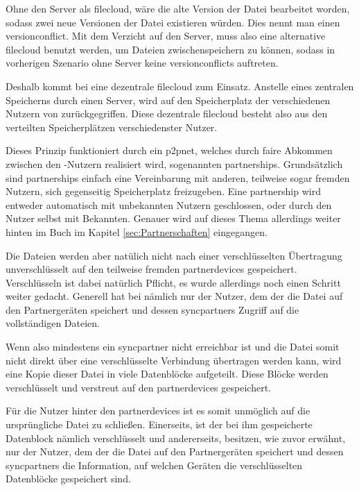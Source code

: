 Ohne den Server als \gls{filecloud}, wäre die alte Version der Datei bearbeitet worden, sodass zwei
neue Versionen der Datei existieren würden. Dies nennt man einen \gls{versionconflict}.
Mit dem Verzicht auf den Server, muss also eine alternative \gls{filecloud} benutzt
werden, um Dateien zwischenspeichern zu können, sodass in vorherigen Szenario ohne Server
keine \glspl{versionconflict} auftreten.

Deshalb kommt bei \sblit eine dezentrale \gls{filecloud} zum Einsatz. Anstelle
eines zentralen Speicherns durch einen Server, wird auf den Speicherplatz der
verschiedenen Nutzern von \sblit zurückgegriffen. Diese dezentrale \gls{filecloud}
besteht also aus den verteilten Speicherplätzen verschiedenster Nutzer.

Dieses Prinzip funktioniert durch ein \gls{p2pnet}, welches durch faire Abkommen zwischen den \sblit-Nutzern realisiert wird,
sogenannten \glspl{partnership}. Grundsätzlich sind \glspl{partnership} einfach eine
Vereinbarung mit anderen, teilweise sogar fremden Nutzern, sich gegenseitig Speicherplatz
freizugeben. Eine \gls{partnership} wird entweder automatisch mit unbekannten Nutzern
geschlossen, oder durch den Nutzer selbst mit Bekannten. Genauer wird auf dieses Thema allerdings weiter hinten im Buch im
Kapitel \ref{sec:Partnerschaften} eingegangen.

Die Dateien werden aber natülich nicht nach einer verschlüsselten Übertragung unverschlüsselt
auf den teilweise fremden \glspl{partnerdevice} gespeichert. Verschlüsseln ist dabei
natürlich Pflicht, es wurde allerdings noch einen Schritt weiter gedacht. Generell
hat bei \sblit nämlich nur der Nutzer, dem der die Datei auf den Partnergeräten speichert und
dessen \glspl{syncpartner} Zugriff auf die vollständigen Dateien.

Wenn also mindestens ein \gls{syncpartner} nicht erreichbar ist und die Datei somit
nicht direkt über eine verschlüsselte Verbindung übertragen werden kann, wird eine Kopie
dieser Datei in viele Datenblöcke aufgeteilt. Diese Blöcke werden verschlüsselt und
verstreut auf den \glspl{partnerdevice} gespeichert.

Für die Nutzer hinter den \glspl{partnerdevice} ist es somit unmöglich auf die ursprüngliche
Datei zu schließen. Einerseits, ist der bei ihm gespeicherte Datenblock nämlich
verschlüsselt und andererseits, besitzen, wie zuvor erwähnt, nur der Nutzer, dem
der die Datei auf den Partnergeräten speichert und dessen \glspl{syncpartner}
die Information, auf welchen Geräten die verschlüsselten Datenblöcke gespeichert sind. %

